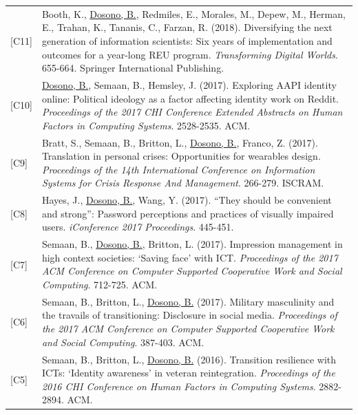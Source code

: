 \documentclass[12pt]{article}
\begin{document}
{\begin{longtable}{R{0.75in}p{5.0in}}
\footnotesize{[C11]} & Booth, K., \href{https://doi.org/10.1007/978-3-319-78105-1_75}{Dosono, B.}, Redmiles, E., Morales, M., Depew, M., Herman, E., Trahan, K., Tananis, C., Farzan, R. (2018). Diversifying the next generation of information scientists: Six years of implementation and outcomes for a year-long REU program. \textit{Transforming Digital Worlds}. 655-664. Springer International Publishing.\\

\footnotesize{[C10]} & \href{https://dl.acm.org/authorize?N41342}{Dosono, B.}, Semaan, B., Hemsley, J. (2017). Exploring AAPI identity online: Political ideology as a factor affecting identity work on Reddit. \textit{Proceedings of the 2017 CHI Conference Extended Abstracts on Human Factors in Computing Systems}. 2528-2535. ACM.\\

\footnotesize{[C9]} & Bratt, S., Semaan, B., Britton, L., \href{https://web.archive.org/web/20250618175300/https://idl.iscram.org/files/sarahbratt/2017/2017_SarahBratt_etal2017.pdf}{Dosono, B.}, Franco, Z. (2017). Translation in personal crises: Opportunities for wearables design. \textit{Proceedings of the 14th International Conference on Information Systems for Crisis Response And Management}. 266-279. ISCRAM.\\

\footnotesize{[C8]} & Hayes, J., \href{https://hdl.handle.net/2142/96755}{Dosono, B.}, Wang, Y. (2017). ``They should be convenient and strong'': Password perceptions and practices of visually impaired users. \textit{iConference 2017 Proceedings}. 445-451.\\

\footnotesize{[C7]} & Semaan, B., \href{https://dl.acm.org/authorize?N41343}{Dosono, B.}, Britton, L. (2017). Impression management in high context societies: `Saving face' with ICT. \textit{Proceedings of the 2017 ACM Conference on Computer Supported Cooperative Work and Social Computing}. 712-725. ACM.\\

\footnotesize{[C6]} & Semaan, B., Britton, L., \href{https://dl.acm.org/authorize?N41344}{Dosono, B.} (2017). Military masculinity and the travails of transitioning: Disclosure in social media. \textit{Proceedings of the 2017 ACM Conference on Computer Supported Cooperative Work and Social Computing}. 387-403. ACM.\\

\footnotesize{[C5]} & Semaan, B., Britton, L., \href{https://dl.acm.org/authorize?N41455}{Dosono, B.} (2016). Transition resilience with ICTs: `Identity awareness' in veteran reintegration. \textit{Proceedings of the 2016 CHI Conference on Human Factors in Computing Systems}. 2882-2894. ACM.\\


\end{longtable}}
\end{document}
